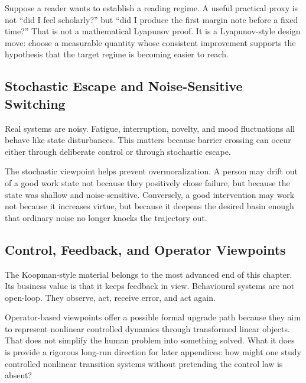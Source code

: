 \begin{example}
Suppose a reader wants to establish a reading regime. A useful practical proxy
is not ``did I feel scholarly?'' but ``did I produce the first margin note
before a fixed time?'' That is not a mathematical Lyapunov proof. It is a
Lyapunov-style design move: choose a measurable quantity whose consistent
improvement supports the hypothesis that the target regime is becoming easier to
reach.
\end{example}

\subsection{Stochastic Escape and Noise-Sensitive Switching}

Real systems are noisy. Fatigue, interruption, novelty, and mood fluctuations
all behave like state disturbances. This matters because barrier crossing can
occur either through deliberate control or through stochastic escape.

\begin{discussion}
The stochastic viewpoint helps prevent overmoralization. A person may drift out
of a good work state not because they positively chose failure, but because the
state was shallow and noise-sensitive. Conversely, a good intervention may
work not because it increases virtue, but because it deepens the desired basin
enough that ordinary noise no longer knocks the trajectory out.
\end{discussion}

\subsection{Control, Feedback, and Operator Viewpoints}

The Koopman-style material belongs to the most advanced end of this chapter.
Its business value is that it keeps feedback in view. Behavioural systems are
not open-loop. They observe, act, receive error, and act again.

\begin{discussion}
Operator-based viewpoints offer a possible formal upgrade path because they aim
to represent nonlinear controlled dynamics through transformed linear objects.
That does not simplify the human problem into something solved. What it does is
provide a rigorous long-run direction for later appendices: how might one study
controlled nonlinear transition systems without pretending the control law is
absent?
\end{discussion}

